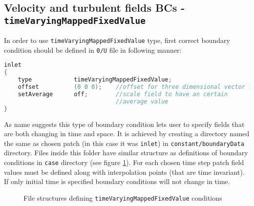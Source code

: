         \subsection{Velocity and turbulent fields BCs - \texttt{timeVaryingMappedFixedValue}}
            In order to use \texttt{timeVaryingMappedFixedValue} type, first correct boundary condition should be defined in \texttt{0/U} file in following manner:
            \begin{lstlisting}[language=C++]
inlet
{
    type            timeVaryingMappedFixedValue;
    offset          (0 0 0);    //offset for three dimensional vector field
    setAverage      off;        //scale field to have an certain 
                                //average value
}
            \end{lstlisting}
            As name suggests this type of boundary condition lets user to specify fields that are both changing in time and space.
            It is achieved by creating a directory named the same as chosen patch (in this case it was \texttt{inlet}) in \texttt{constant/boundaryData} directory.
            Files inside this folder have similar structure as definitions of boundary conditions in \texttt{case} directory (see figure \ref{fig::ofoam_timeVar}). For each chosen time step patch field values must be defined along with interpolation points (that are time invariant). If only initial time is specified boundary conditions will not change in time.
            \begin{figure}[ht!]
      
                \caption{File structures defining \texttt{timeVaryingMappedFixedValue} conditions}
                \label{fig::ofoam_timeVar}
            \end{figure}

